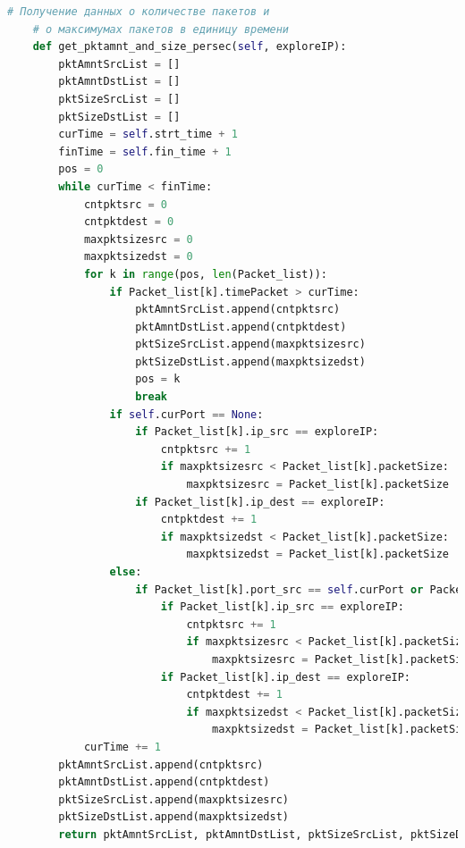 \documentclass[bachelor, och, coursework]{SCWorks}
\begin{document}
\begin{lstlisting}[language=Python]
    # Получение данных о количестве пакетов и
    # о максимумах пакетов в единицу времени
    def get_pktamnt_and_size_persec(self, exploreIP):
        pktAmntSrcList = []
        pktAmntDstList = []
        pktSizeSrcList = []
        pktSizeDstList = []
        curTime = self.strt_time + 1
        finTime = self.fin_time + 1
        pos = 0
        while curTime < finTime:
            cntpktsrc = 0
            cntpktdest = 0
            maxpktsizesrc = 0
            maxpktsizedst = 0
            for k in range(pos, len(Packet_list)):
                if Packet_list[k].timePacket > curTime:
                    pktAmntSrcList.append(cntpktsrc)
                    pktAmntDstList.append(cntpktdest)
                    pktSizeSrcList.append(maxpktsizesrc)
                    pktSizeDstList.append(maxpktsizedst)
                    pos = k
                    break
                if self.curPort == None:
                    if Packet_list[k].ip_src == exploreIP:
                        cntpktsrc += 1
                        if maxpktsizesrc < Packet_list[k].packetSize:
                            maxpktsizesrc = Packet_list[k].packetSize
                    if Packet_list[k].ip_dest == exploreIP:
                        cntpktdest += 1
                        if maxpktsizedst < Packet_list[k].packetSize:
                            maxpktsizedst = Packet_list[k].packetSize
                else:
                    if Packet_list[k].port_src == self.curPort or Packet_list[k].port_dest == self.curPort:
                        if Packet_list[k].ip_src == exploreIP:
                            cntpktsrc += 1
                            if maxpktsizesrc < Packet_list[k].packetSize:
                                maxpktsizesrc = Packet_list[k].packetSize
                        if Packet_list[k].ip_dest == exploreIP:
                            cntpktdest += 1
                            if maxpktsizedst < Packet_list[k].packetSize:
                                maxpktsizedst = Packet_list[k].packetSize
            curTime += 1
        pktAmntSrcList.append(cntpktsrc)
        pktAmntDstList.append(cntpktdest)
        pktSizeSrcList.append(maxpktsizesrc)
        pktSizeDstList.append(maxpktsizedst)
        return pktAmntSrcList, pktAmntDstList, pktSizeSrcList, pktSizeDstList


\end{lstlisting}
\end{document}
